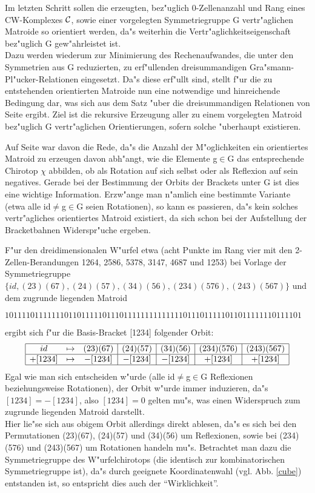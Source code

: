 Im letzten Schritt sollen die erzeugten, bez"uglich 0-Zellenanzahl
und Rang eines CW-Komplexes ${\cal C}$, sowie einer vorgelegten Symmetriegruppe G
vertr"aglichen Matroide so orientiert werden, da"s weiterhin die
Vertr"aglichkeitseigenschaft bez"uglich G gew"ahrleistet ist.\\
Dazu werden wiederum zur Minimierung des Rechenaufwandes, die unter den
Symmetrien aus G reduzierten, zu erf"ullenden dreisummandigen
Gra"smann-Pl"ucker-Relationen eingesetzt. Da"s diese erf"ullt sind, stellt f"ur
die zu entstehenden orientierten Matroide nun eine notwendige und hinreichende
Bedingung dar, was sich aus dem Satz "uber die dreisummandigen Relationen von
Seite \pageref{dgpr} ergibt. Ziel ist die rekursive Erzeugung aller zu einem
vorgelegten Matroid bez"uglich G vertr"aglichen Orientierungen, sofern solche
"uberhaupt existieren.

Auf Seite \pageref{symmtest} war davon die Rede, da"s die Anzahl der
M"oglichkeiten ein orientiertes Matroid zu erzeugen davon abh"angt, wie die
Elemente g$\in$G das entsprechende Chirotop $\chi$ abbilden, ob als Rotation
auf sich selbst oder als Reflexion auf sein negatives. Gerade bei der
Bestimmung der Orbits der Brackets unter G ist dies eine wichtige Information.
Erzw"ange man n"amlich eine bestimmte Variante (etwa alle id$\neq$g$\in$G seien
Rotationen), so kann es passieren, da"s kein solches vertr"agliches orientiertes
Matroid existiert, da sich schon bei der Aufstellung der Bracketbahnen
Widerspr"uche ergeben.

F"ur den dreidimensionalen W"urfel etwa (acht Punkte im Rang vier mit den
2-Zellen-Berandungen 1264, 2586, 5378, 3147, 4687 und 1253) bei Vorlage der
Symmetriegruppe $\{id, (23)(67), (24)(57), (34)(56), (234)(576), (243)(567)\}$
und dem zugrunde liegenden Matroid

\begin{center}{\small
$1011110111111101101111101110111111111111110111011111011011111110111101$
}\end{center}

ergibt sich f"ur die Basis-Bracket [1234] folgender Orbit:
$$
\begin{array}{|ccc|c|c|c|c|}
\hline
id & \mapsto & (23)(67) & (24)(57) & (34)(56) & (234)(576) & (243)(567) \\
\hline
+[1234] & \mapsto & -[1234] & -[1234] & -[1234] & +[1234] & +[1234] \\
\hline
\end{array}
$$
Egal wie man sich entscheiden w"urde (alle id$\neq$g$\in$G Reflexionen
beziehungsweise Rotationen), der Orbit w"urde immer induzieren, da"s
$[1234]=-[1234]$, also $[1234]=0$ gelten mu"s, was einen Widerspruch zum
zugrunde liegenden Matroid darstellt.\\
Hier lie"se sich aus obigem Orbit allerdings direkt ablesen, da"s es sich bei
den Permutationen (23)(67), (24)(57) und (34)(56) um Reflexionen, sowie bei
(234)(576) und (243)(567) um Rotationen handeln mu"s. Betrachtet man dazu
die Symmetriegruppe des W"urfelchirotops (die identisch zur kombinatorischen
Symmetriegruppe ist), da"s durch geeignete Koordinatenwahl (vgl. Abb.
\ref{cube}) entstanden ist, so entspricht dies auch der "`Wirklichkeit"'.
\vskip4mm

